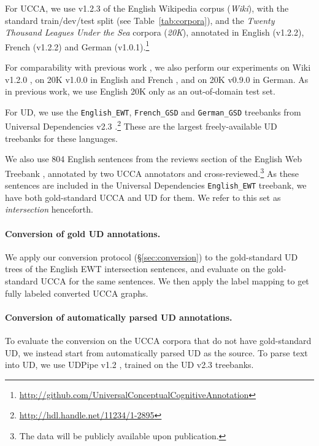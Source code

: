 \documentclass[11pt,a4paper]{article}
\begin{document}
For UCCA, we use v1.2.3 of the English Wikipedia corpus (\textit{Wiki}),
with the standard train/dev/test split (see Table~\ref{tab:corpora}),
and the \textit{Twenty Thousand Leagues Under the Sea} corpora (\textit{20K}),
annotated in English (v1.2.2), French (v1.2.2)
and German (v1.0.1).\footnote{\url{http://github.com/UniversalConceptualCognitiveAnnotation}}

For comparability with previous work \cite{hershcovich2017a,hershcovich2018multitask},
we also perform our experiments on Wiki v1.2.0 \cite{abend2013universal},
on 20K v1.0.0 in English and French \cite{sulem2015conceptual},
and on 20K v0.9.0 in German.
As in previous work, we use English 20K only as an out-of-domain test set.

For UD, we use the \verb|English_EWT|, \verb|French_GSD| and \verb|German_GSD|
treebanks from Universal Dependencies v2.3
\cite{11234/1-2895}.\footnote{\url{http://hdl.handle.net/11234/1-2895}}
These are the largest freely-available UD treebanks for these languages.

We also use 804 English sentences from the reviews section of the English Web Treebank
\cite[EWT; ][]{bies2012english},
annotated by two UCCA annotators and
cross-reviewed.\footnote{The data will be publicly
available upon publication.}
As these sentences are included in the Universal Dependencies \verb|English_EWT| treebank,
we have both gold-standard UCCA and UD for them.
We refer to this set as \textit{intersection} henceforth.

\paragraph{Conversion of gold UD annotations.}

We apply our conversion protocol (\S\ref{sec:conversion}) to
the gold-standard UD trees of the English EWT intersection sentences,
and evaluate on the gold-standard UCCA for the same sentences.
We then apply the label mapping to get fully labeled converted UCCA graphs.

\paragraph{Conversion of automatically parsed UD annotations.}

To evaluate the conversion on the UCCA corpora that do not have gold-standard UD,
we instead start from automatically parsed UD as the source.
To parse text into UD, we use UDPipe v1.2 \cite{udpipe,udpipe:2017},
trained on the UD v2.3 treebanks.
\end{document}
